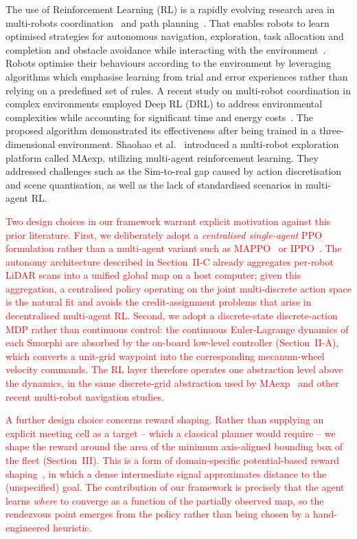 \documentclass[journal]{IEEEtran}
\begin{document}
The use of Reinforcement Learning (RL) is a rapidly evolving research area in multi-robots coordination~\cite{liu2021visuomotor} and path planning~\cite{wijegunawardana2025risk}. That enables robots to learn optimised strategies for autonomous navigation, exploration, task allocation and completion and obstacle avoidance while interacting with the environment~\cite{Singh2022-vm,s23073625}. Robots optimise their behaviours according to the environment by leveraging algorithms which emphasise learning from trial and error experiences rather than relying on a predefined set of rules. A recent study on multi-robot coordination in complex environments employed Deep RL (DRL) to address environmental complexities while accounting for significant time and energy costs~\cite{multi5}. The proposed algorithm demonstrated its effectiveness after being trained in a three-dimensional environment. Shaohao et al.~\cite{10611573} introduced a multi-robot exploration platform called MAexp, utilizing multi-agent reinforcement learning. They addressed challenges such as the Sim-to-real gap caused by
action discretisation and scene quantisation, as well as the lack of standardised scenarios in multi-agent RL.

\textcolor{red}{Two design choices in our framework warrant explicit motivation against this prior literature. First, we deliberately adopt a \emph{centralised single-agent} PPO formulation rather than a multi-agent variant such as MAPPO~\cite{yu2022mappo} or IPPO~\cite{dewitt2020independent}. The autonomy architecture described in Section~II-C already aggregates per-robot LiDAR scans into a unified global map on a host computer; given this aggregation, a centralised policy operating on the joint multi-discrete action space is the natural fit and avoids the credit-assignment problems that arise in decentralised multi-agent RL. Second, we adopt a discrete-state discrete-action MDP rather than continuous control: the continuous Euler-Lagrange dynamics of each Smorphi are absorbed by the on-board low-level controller (Section~II-A), which converts a unit-grid waypoint into the corresponding mecanum-wheel velocity commands. The RL layer therefore operates one abstraction level above the dynamics, in the same discrete-grid abstraction used by MAexp~\cite{10611573} and other recent multi-robot navigation studies.}

\textcolor{red}{A further design choice concerns reward shaping. Rather than supplying an explicit meeting cell as a target -- which a classical planner would require -- we shape the reward around the area of the minimum axis-aligned bounding box of the fleet (Section~III). This is a form of domain-specific potential-based reward shaping~\cite{ng1999policy}, in which a dense intermediate signal approximates distance to the (unspecified) goal. The contribution of our framework is precisely that the agent learns \emph{where} to converge as a function of the partially observed map, so the rendezvous point emerges from the policy rather than being chosen by a hand-engineered heuristic.}
\end{document}
